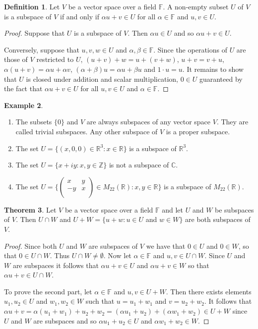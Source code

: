 \documentclass[11pt,a4paper]{article}
\theoremstyle{definition}
\newtheorem{thm}{Theorem}[subsection]
\newtheorem{defn}[thm]{Definition}
\newtheorem{exa}[thm]{Example}
\begin{document}
\begin{defn}
 Let $V$ be a vector space over a field $\mathbb{F}$. A non-empty subset $U$ of $V$ is a subspace of $V$ if and only if $\alpha u+v\in U$ for all $\alpha \in \mathbb{F}$ and $u,v\in U$.
\end{defn}
 
 
 
\begin{proof}
Suppose that $U$ is a subspace of $V$. Then $\alpha u\in U$ and so $\alpha u+v\in U$.

Conversely, suppose that $u,v,w\in U$ and $\alpha, \beta \in \mathbb{F}$. Since the operations of $U$ are those of $V$ restricted to $U$, $(u+v)+w=u+(v+w)$, $u+v=v+u$, $\alpha(u+v)=\alpha u+\alpha v$, $(\alpha+\beta )u=\alpha u+\beta u$ and $1\cdot u=u$. It remains to show that $U$ is closed under addition and scalar multiplication, $0\in U$ guaranteed by the fact that $\alpha u+v\in U$ for all $u,v\in U$ and $\alpha \in \mathbb{F}$.
\end{proof}


\begin{exa}
\begin{enumerate}
\item The subsets $\{0\}$ and $V$ are always subspaces of any vector space $V$. They are called trivial subspaces. Any other subspace of $V$ is a proper subspace.
\item The set $U=\Big\{(x,0,0)\in \mathbb{R}^3:x\in \mathbb{R}\Big\}$ is a subspace of $\mathbb{R}^3$.
\item The set $U=\{x+iy:x,y\in \mathbb{Z}\}$ is not a subspace of $\mathbb{C}$.
\item The set $U=\Bigg\{
\begin{pmatrix}
x&y\\-y&x\\
\end{pmatrix}
\in M_{22}(\mathbb{R}):x,y\in \mathbb{R}\Bigg\}$ is a subspace of $M_{22}(\mathbb{R})$.
\end{enumerate}
\end{exa}


\begin{thm}
Let $V$ be a vector space over a field $\mathbb{F}$ and let $U$ and $W$ be subspaces of $V$. Then $U\cap W$ and $U+W=\{u+w:u\in U$ and $w\in W\}$ are both subspaces of $V$.
\end{thm}
\begin{proof}
Since both $U$ and $W$ are subspaces of $V$ we have that $0\in U$ and $0\in W$, so that $0\in U\cap W$. Thus $U\cap W\neq \emptyset$. Now let $\alpha \in \mathbb{F}$ and $u,v\in U\cap W$. Since $U$ and $W$ are subspaces it follows that $\alpha u+v\in U$ and $\alpha u+v\in W$ so that $\alpha u+v\in U\cap W$.

To prove the second part, let $\alpha \in \mathbb{F}$ and $u,v\in U+W$. Then there exists elements $u_1,u_2\in U$ and $w_1,w_2\in W$ such that $u=u_1+w_1$ and $v=u_2+w_2$. It follows that\\ $\alpha u+v=\alpha (u_1+w_1)+u_2+w_2=(\alpha u_1+u_2)+(\alpha w_1+w_2)\in U+W$ since $U$ and $W$ are subspaces and so $\alpha u_1+u_2\in U$ and $\alpha w_1+w_2\in W$.


\pagebreak
\end{proof}
\end{document}
